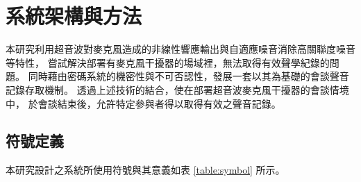 \chapter{系統架構與方法}

    本研究利用超音波對麥克風造成的非線性響應輸出與自適應噪音消除高關聯度噪音等特性，
嘗試解決部署有麥克風干擾器的場域裡，無法取得有效聲學紀錄的問題\cite{chen2020wearable}。
同時藉由密碼系統的機密性與不可否認性，發展一套以其為基礎的會談聲音記錄存取機制。
透過上述技術的結合，使在部署超音波麥克風干擾器的會談情境中，
於會談結束後，允許特定參與者得以取得有效之聲音記錄。


\section{符號定義}

    本研究設計之系統所使用符號與其意義如表 \ref{table:symbol} 所示。

